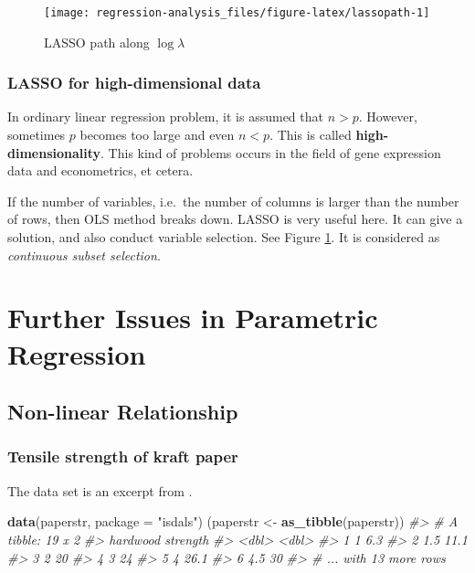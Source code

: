 \documentclass[]{book}
\newenvironment{Shaded}{\begin{snugshade}}{\end{snugshade}}
\newcommand{\CommentTok}[1]{\textcolor[rgb]{0.56,0.35,0.01}{\textit{#1}}}
\newcommand{\DataTypeTok}[1]{\textcolor[rgb]{0.13,0.29,0.53}{#1}}
\newcommand{\KeywordTok}[1]{\textcolor[rgb]{0.13,0.29,0.53}{\textbf{#1}}}
\newcommand{\NormalTok}[1]{#1}
\newcommand{\StringTok}[1]{\textcolor[rgb]{0.31,0.60,0.02}{#1}}
\theoremstyle{definition}
\theoremstyle{definition}
\theoremstyle{definition}
\theoremstyle{remark}
\begin{document}
\begin{figure}[H]

{\centering \texttt{[image: regression-analysis\_files/figure-latex/lassopath-1]} 

}

\caption{LASSO path along $\log \lambda$}\label{fig:lassopath}
\end{figure}

\hypertarget{lasso-for-high-dimensional-data}{%
\subsection{LASSO for high-dimensional data}\label{lasso-for-high-dimensional-data}}

In ordinary linear regression problem, it is assumed that \(n > p\). However, sometimes \(p\) becomes too large and even \(n < p\). This is called \textbf{high-dimensionality}. This kind of problems occurs in the field of gene expression data and econometrics, et cetera.

If the number of variables, i.e.~the number of columns is larger than the number of rows, then OLS method breaks down. LASSO is very useful here. It can give a solution, and also conduct variable selection. See Figure \ref{fig:lassopath}. It is considered as \emph{continuous subset selection}.

\hypertarget{further}{%
\chapter{Further Issues in Parametric Regression}\label{further}}

\hypertarget{non-linear-relationship}{%
\section{Non-linear Relationship}\label{non-linear-relationship}}

\hypertarget{tensile-strength-of-kraft-paper}{%
\subsection{Tensile strength of kraft paper}\label{tensile-strength-of-kraft-paper}}

The data set is an excerpt from \citet{Ekstrom:2014aa}.

\begin{Shaded}
\begin{Highlighting}[]
\KeywordTok{data}\NormalTok{(paperstr, }\DataTypeTok{package =} \StringTok{"isdals"}\NormalTok{)}
\NormalTok{(paperstr <-}\StringTok{ }\KeywordTok{as_tibble}\NormalTok{(paperstr))}
\CommentTok{#> # A tibble: 19 x 2}
\CommentTok{#>   hardwood strength}
\CommentTok{#>      <dbl>    <dbl>}
\CommentTok{#> 1      1        6.3}
\CommentTok{#> 2      1.5     11.1}
\CommentTok{#> 3      2       20  }
\CommentTok{#> 4      3       24  }
\CommentTok{#> 5      4       26.1}
\CommentTok{#> 6      4.5     30  }
\CommentTok{#> # ... with 13 more rows}
\end{Highlighting}
\end{Shaded}
\end{document}
